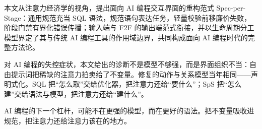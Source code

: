 \documentclass[11pt,a4paper]{ctexart}
\begin{document}
本文从注意力经济学的视角，提出面向 AI 编程交互界面的重构范式 Spec-per-Stage：通用规范充当 SQL 语法，规范语句表达任务，轻量校验前移廉价失败，阶段门禁有界化错误传播；输入端与 F2F 的输出端范式衔接，并以生命周期分工模型界定了其与传统 AI 编程工具的作用域边界，共同构成面向 AI 编程时代的完整方法论。

对 AI 编程的失控症状\cite{ref2}，本文给出的诊断不是模型不够强，而是界面组织不当：自由提示词把稀缺的注意力拍卖给了不变量。修复的动作与关系模型当年相同——声明式化。SQL 把“怎么取”交给优化器，把注意力还给“要什么”；SpS 把“怎么建”交给语法与模型，把注意力还给“建什么”。

AI 编程的下一个杠杆，可能不在更强的模型，而在更好的语法。把不变量吸收进规范，把注意力还给注意力该在的地方。

\clearpage


\end{document}
